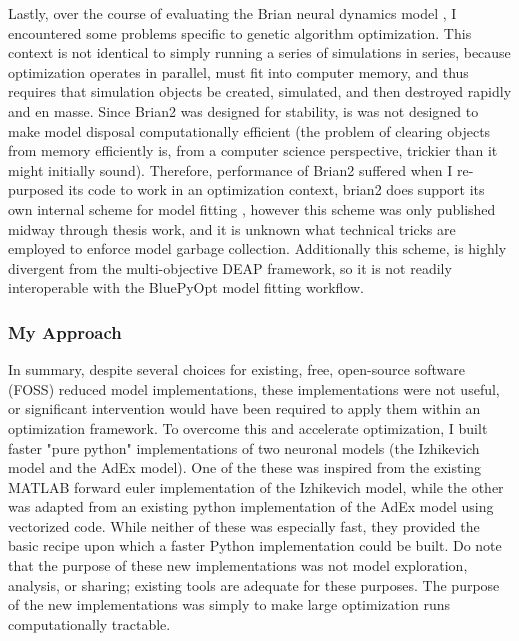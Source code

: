 Lastly, over the course of evaluating the Brian neural dynamics model \cite{gerstner2014neuronal}, I encountered some problems specific to genetic algorithm optimization.
This context is not identical to simply running a series of simulations in series, because optimization operates in parallel, must fit into computer memory, and thus requires that simulation objects be created, simulated, and then destroyed rapidly and en masse.
Since Brian2 was designed for stability, is was not designed to make model disposal computationally efficient (the problem of clearing objects from memory efficiently is, from a computer science perspective, trickier than it might initially sound).
Therefore, performance of Brian2 suffered when I re-purposed its code to work in an optimization context, brian2 does support its own internal scheme for model fitting \cite{brian2modelfitting}, however this scheme was only published midway through thesis work, and it is unknown what technical tricks are employed to enforce model garbage collection. Additionally this scheme, is highly divergent from the multi-objective DEAP framework, so it is not readily interoperable with the BluePyOpt model fitting workflow.

\subsubsection{My Approach}
In summary, despite several choices for existing, free, open-source software (FOSS) reduced model
implementations, these implementations were not useful, or significant intervention would have been required to apply them within an optimization framework.
To overcome this and accelerate optimization, I built faster "pure python" implementations of two neuronal models (the Izhikevich model and the AdEx model).
One of the these was inspired from the existing MATLAB forward euler implementation of the Izhikevich model, while the other was adapted from an existing python implementation of the AdEx model using vectorized code.
While neither of these was especially fast, they provided the basic recipe upon which a faster Python implementation could be built.
Do note that the purpose of these new implementations was not model exploration, analysis, or sharing; existing tools are adequate for these purposes.
The purpose of the new implementations was simply to make large optimization runs computationally tractable.

